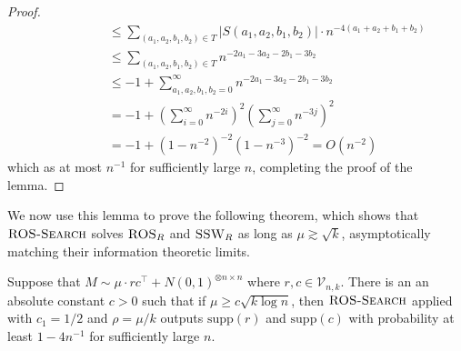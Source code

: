 \begin{proof}
\begin{align*}
&\quad \quad \quad \quad \le \sum_{(a_1, a_2, b_1, b_2) \in T} |S(a_1, a_2, b_1, b_2)| \cdot n^{-4(a_1 + a_2 + b_1 + b_2)} \\
&\quad \quad \quad \quad \le \sum_{(a_1, a_2, b_1, b_2) \in T} n^{-2a_1 - 3a_2 - 2b_1 -3b_2} \\
&\quad \quad \quad \quad \le -1 + \sum_{a_1, a_2, b_1, b_2 = 0}^\infty n^{-2a_1 - 3a_2 - 2b_1 -3b_2} \\
&\quad \quad \quad \quad = -1 + \left( \sum_{i = 0}^\infty n^{-2i} \right)^2 \left( \sum_{j = 0}^\infty n^{-3j} \right)^2 \\
&\quad \quad \quad \quad = -1 + (1 - n^{-2})^{-2}(1 - n^{-3})^{-2} = O(n^{-2})
\end{align*}
which as at most $n^{-1}$ for sufficiently large $n$, completing the proof of the lemma.
\end{proof}

We now use this lemma to prove the following theorem, which shows that $\textsc{ROS-Search}$ solves $\textsc{ROS}_R$ and $\textsc{SSW}_R$ as long as $\mu \gtrsim \sqrt{k}$, asymptotically matching their information theoretic limits.

\begin{theorem}
Suppose that $M \sim \mu \cdot rc^\top + N(0, 1)^{\otimes n \times n}$ where $r, c \in \mathcal{V}_{n, k}$. There is an an absolute constant $c > 0$ such that if $\mu \ge c \sqrt{k \log n}$, then $\textsc{ROS-Search}$ applied with $c_1 = 1/2$ and $\rho = \mu/k$ outputs $\text{supp}(r)$ and $\text{supp}(c)$ with probability at least $1 - 4n^{-1}$ for sufficiently large $n$.
\end{theorem}

